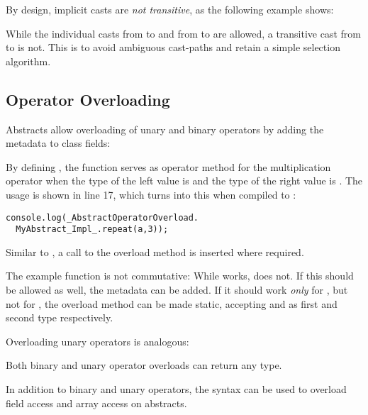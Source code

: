 

By design, implicit casts are \emph{not transitive}, as the following example shows:

While the individual casts from  to  and from  to  are allowed, a transitive cast from  to  is not. This is to avoid ambiguous cast-paths and retain a simple selection algorithm. 




\subsection{Operator Overloading}
\label{types-abstract-operator-overloading}

Abstracts allow overloading of unary and binary operators by adding the  metadata to class fields:

By defining , the function  serves as operator method for the multiplication \expr{*} operator when the type of the left value is  and the type of the right value is . The usage is shown in line 17, which turns into this when compiled to :

\begin{lstlisting}
console.log(_AbstractOperatorOverload.
  MyAbstract_Impl_.repeat(a,3));
\end{lstlisting}
Similar to , a call to the overload method is inserted where required.

The example  function is not commutative: While  works,  does not. If this should be allowed as well, the  metadata can be added. If it should work \emph{only} for , but not for , the overload method can be made static, accepting  and  as first and second type respectively.

Overloading unary operators is analogous:

Both binary and unary operator overloads can return any type.


In addition to binary and unary operators, the  syntax can be used to overload field access and array access on abstracts.

